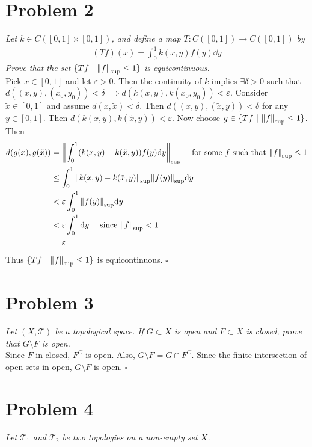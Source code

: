 \documentclass[12pt]{article}
\theoremstyle{plain}
\begin{document}
\section*{Problem 2}
\emph{Let $k \in C([0,1] \times [0,1])$, and define a map $T:C([0,1]) \rightarrow C([0,1])$ by}
\begin{align*}
    (Tf)(x) = \int_0^1 k(x, y)f(y) \dd y
\end{align*}
\emph{Prove that the set $\{Tf\ |\ \norm{f}_\text{sup} \leq 1\}$ is equicontinuous.} \\

Pick $x \in [0,1]$ and let $\varepsilon >0$.  Then the continuity of $k$ implies $\exists \delta >0$ such that $d((x, y), (x_0, y_0)) < \delta \implies d(k(x,y), k(x_0, y_0)) < \varepsilon$.  Consider $\tilde{x} \in [0,1]$ and assume $d(x, \tilde{x})< \delta$.  Then $d((x, y), (\tilde{x}, y)) < \delta$ for any $y \in [0,1]$.  Then $d(k(x, y), k(\tilde{x}, y)) < \varepsilon$.  Now choose $g \in \{Tf\ |\ \norm{f}_\text{sup} \leq 1\}$.  Then
\begin{align*}
    d(g(x), g(\tilde{x})) &= \norm{\int_0^1 (k(x, y) - k(\tilde{x}, y))f(y) \dd y}_\text{sup}\ \ \ \ \text{for some $f$ such that $\norm{f}_\text{sup} \leq 1$} \\
    &\leq \int_0^1 \norm{k(x,y) - k(\tilde{x}, y)}_\text{sup}\norm{f(y)}_\text{sup}\dd y\\
    &< \varepsilon \int_0^1 \norm{f(y)}_\text{sup} \dd y \\
    &< \varepsilon \int_0^1 \dd y \ \ \ \ \text{since $\norm{f}_\text{sup} < 1$} \\
    &= \varepsilon
\end{align*}
Thus $\{Tf\ |\ \norm{f}_\text{sup} \leq 1\}$ is equicontinuous. \hfill $\square$

\section*{Problem 3}
\emph{Let $(X, \mathcal{T})$ be a topological space.  If $G \subset X$ is open and $F \subset X$ is closed, prove that $G \setminus F$ is open.}\\

Since $F$ in closed, $F^C$ is open.  Also, $G\setminus F = G\cap F^C$.  Since the finite intersection of open sets in open, $G\setminus F$ is open. \hfill $\square$

\section*{Problem 4}
\emph{Let $\mathcal{T}_1$ and $\mathcal{T}_2$ be two topologies on a non-empty set $X$.}
\end{document}
